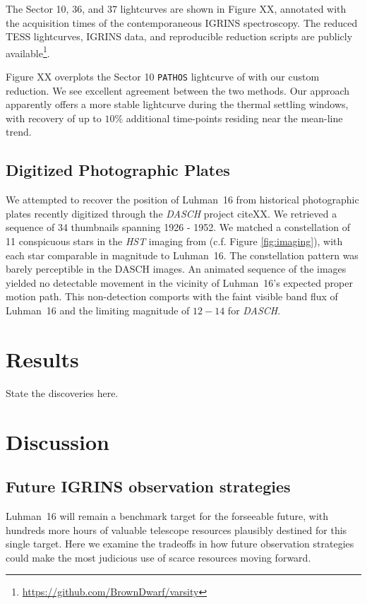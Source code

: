 \documentclass[modern]{aastex631}
\begin{document}
The Sector 10, 36, and 37 lightcurves are shown in Figure XX, annotated with the acquisition times of the contemporaneous IGRINS spectroscopy.  The reduced TESS lightcurves, IGRINS data, and reproducible reduction scripts are publicly available\footnote{\url{https://github.com/BrownDwarf/varsity}}.

Figure XX overplots the Sector 10 \texttt{PATHOS} lightcurve of \citet{2021ApJ...906...64A} with our custom reduction.  We see excellent agreement between the two methods.  Our approach apparently offers a more stable lightcurve during the thermal settling windows, with recovery of up to $10\%$ additional time-points residing near the mean-line trend.

\subsection{Digitized Photographic Plates}
We attempted to recover the position of Luhman~16 from historical photographic plates recently digitized through the \emph{DASCH} project citeXX.  We retrieved a sequence of 34 thumbnails spanning 1926 - 1952.  We matched a constellation of 11 conspicuous stars in the \emph{HST} imaging from \citet{2017MNRAS.470.1140B} (c.f. Figure \ref{fig:imaging}), with each star comparable in magnitude to Luhman~16.  The constellation pattern was barely perceptible in the DASCH images.  An animated sequence of the images yielded no detectable movement in the vicinity of Luhman~16's expected proper motion path.  This non-detection comports with the faint visible band flux of Luhman~16 and the limiting magnitude of $12-14$ for \emph{DASCH}.

\section{Results}
State the discoveries here.

\section{Discussion}

\subsection{Future IGRINS observation strategies}
Luhman~16 will remain a benchmark target for the forseeable future, with hundreds more hours of valuable telescope resources plausibly destined for this single target.  Here we examine the tradeoffs in how future observation strategies could make the most judicious use of scarce resources moving forward.
\end{document}
